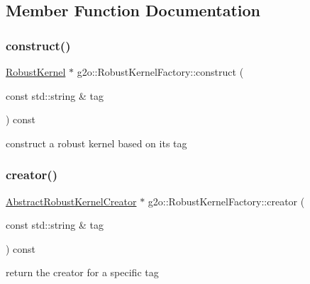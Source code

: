 \subsection{Member Function Documentation}
\mbox{\label{classg2o_1_1_robust_kernel_factory_a031a4fdb890d6191c0bff8aedfb078c6}} 
\subsubsection{\texorpdfstring{construct()}{construct()}}
{\footnotesize\ttfamily \mbox{\hyperlink{classg2o_1_1_robust_kernel}{Robust\+Kernel}} $\ast$ g2o\+::\+Robust\+Kernel\+Factory\+::construct (\begin{DoxyParamCaption}\item[{const std\+::string \&}]{tag }\end{DoxyParamCaption}) const}

construct a robust kernel based on its tag \mbox{\label{classg2o_1_1_robust_kernel_factory_a3679a51bd829f6d47e8312d339339a79}} 
\subsubsection{\texorpdfstring{creator()}{creator()}}
{\footnotesize\ttfamily \mbox{\hyperlink{classg2o_1_1_abstract_robust_kernel_creator}{Abstract\+Robust\+Kernel\+Creator}} $\ast$ g2o\+::\+Robust\+Kernel\+Factory\+::creator (\begin{DoxyParamCaption}\item[{const std\+::string \&}]{tag }\end{DoxyParamCaption}) const}

return the creator for a specific tag \mbox{\label{classg2o_1_1_robust_kernel_factory_a6c96f77eb4a14e5e8f5b46eb734c0393}} 
